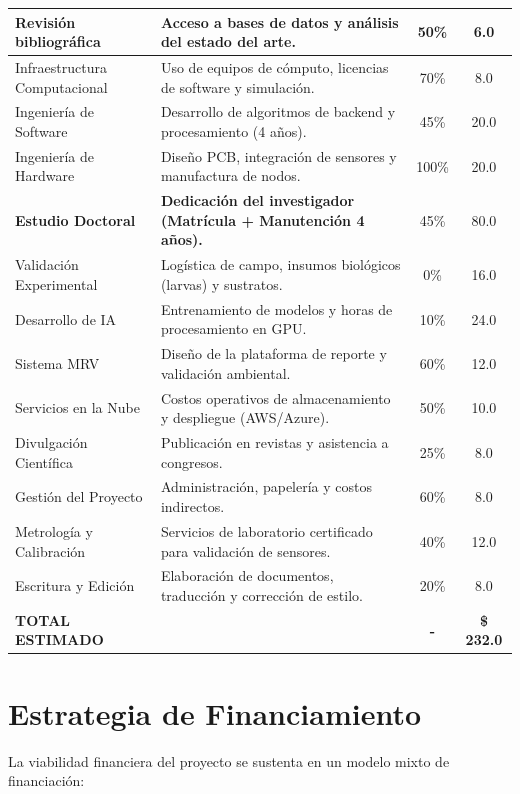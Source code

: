 \begin{longtable}{|p{5cm}|p{6cm}|c|c|}
    Revisión bibliográfica & Acceso a bases de datos y análisis del estado del arte. & 50\% & 6.0 \\
    \hline
    Infraestructura Computacional & Uso de equipos de cómputo, licencias de software y simulación. & 70\% & 8.0 \\
    \hline
    Ingeniería de Software & Desarrollo de algoritmos de backend y procesamiento (4 años). & 45\% & 20.0 \\
    \hline
    Ingeniería de Hardware & Diseño PCB, integración de sensores y manufactura de nodos. & 100\% & 20.0 \\
    \hline
    \textbf{Estudio Doctoral} & \textbf{Dedicación del investigador (Matrícula + Manutención 4 años).} & 45\% & 80.0 \\
    \hline
    Validación Experimental & Logística de campo, insumos biológicos (larvas) y sustratos. & 0\% & 16.0 \\
    \hline
    Desarrollo de IA & Entrenamiento de modelos y horas de procesamiento en GPU. & 10\% & 24.0 \\
    \hline
    Sistema MRV & Diseño de la plataforma de reporte y validación ambiental. & 60\% & 12.0 \\
    \hline
    Servicios en la Nube & Costos operativos de almacenamiento y despliegue (AWS/Azure). & 50\% & 10.0 \\
    \hline
    Divulgación Científica & Publicación en revistas y asistencia a congresos. & 25\% & 8.0 \\
    \hline
    Gestión del Proyecto & Administración, papelería y costos indirectos. & 60\% & 8.0 \\
    \hline
    Metrología y Calibración & Servicios de laboratorio certificado para validación de sensores. & 40\% & 12.0 \\
    \hline
    Escritura y Edición & Elaboración de documentos, traducción y corrección de estilo. & 20\% & 8.0 \\
    \hline 
    \textbf{TOTAL ESTIMADO} &  & \textbf{-} & \textbf{\$ 232.0} \\
    \hline
\end{longtable}

\section{Estrategia de Financiamiento}

La viabilidad financiera del proyecto se sustenta en un modelo mixto de financiación:

